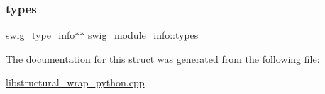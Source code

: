 \mbox{\label{structswig__module__info_ad658c7738e9a035ef8eea865322fbf13}} 
\subsubsection{\texorpdfstring{types}{types}}
{\footnotesize\ttfamily \hyperlink{structswig__type__info}{swig\+\_\+type\+\_\+info}$\ast$$\ast$ swig\+\_\+module\+\_\+info\+::types}



The documentation for this struct was generated from the following file\+:\begin{DoxyCompactItemize}
\item 
\hyperlink{libstructural__wrap__python_8cpp}{libstructural\+\_\+wrap\+\_\+python.\+cpp}\end{DoxyCompactItemize}
